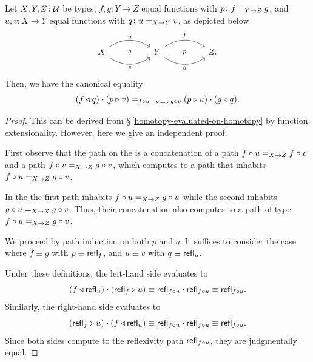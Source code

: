 \begin{prop}\label{prop:path-interchange}
    Let\/ $X,Y,Z\colon\univ$ be types, $f,g\colon Y\to Z$ equal functions with $p\colon f\eq{Y\to Z}g$, and\/ $u,v\colon X\to Y$ equal functions with $q\colon u\eq{X\to Y}v$, as depicted below
    \[
        \begin{tikzcd}[column sep=huge]
            X
                    \arrow[r,"u",bend left=35]
                    \arrow[r,"v"',bend right=35]
                    \arrow[r,"\scriptstyle q",phantom]
                &Y
                    \arrow[r,"f",bend left=35]
                    \arrow[r,"g"',bend right=35]
                    \arrow[r,"\scriptstyle p",phantom]
                &Z.
        \end{tikzcd}
    \]
    Then, we have the canonical equality
    \[
        (f\triangleleft q)\mathbin{\boldsymbol{\cdot}}(p\triangleright v)
        \mathrel{=_{f\circ u\mathrel{=_{X\to Z}}g\circ v}}
        (p\triangleright u)\mathbin{\boldsymbol{\cdot}}(g\triangleleft q).
    \]
\end{prop}

\begin{proof}
    This can be derived from \S\,\ref{homotopy-evaluated-on-homotopy} by function extensionality. However, here we give an independent proof.

    First observe that the path on the \lhs is a concatenation of a path $f\circ u\mathrel{=_{X\to Z}}f\circ v$ and a path $f\circ v\mathrel{=_{X\to Z}}g\circ v$, which computes to a path that inhabits $f\circ u\mathrel{=_{X\to Z}}g\circ v$.

    In the \rhs the first path inhabits $f\circ u\mathrel{=_{X\to Z}}g\circ u$ while the second inhabits $g\circ u\mathrel{=_{X\to Z}}g\circ v$. Thus, their concatenation also computes to a path of type $f\circ u\mathrel{=_{X\to Z}}g\circ v$.

    We proceed by path induction on both \/ $p$ and \/ $q$. It suffices to consider the case where \/ $f\equiv g$ with \/ $p\equiv\mathsf{refl}_f$, and \/ $u\equiv v$ with \/ $q\equiv\mathsf{refl}_u$.

    Under these definitions, the left-hand side evaluates to
    \[
        (f\triangleleft\mathsf{refl}_u)\mathbin{\boldsymbol{\cdot}}(\mathsf{refl}_f\triangleright u)
        \equiv\mathsf{refl}_{f\circ u}\mathbin{\boldsymbol{\cdot}}\mathsf{refl}_{f\circ u}
        \equiv\mathsf{refl}_{f\circ u}.
    \]
    Similarly, the right-hand side evaluates to
    \[
        (\mathsf{refl}_f\triangleright u)\mathbin{\boldsymbol{\cdot}}(f\triangleleft\mathsf{refl}_u)
        \equiv\mathsf{refl}_{f\circ u}\mathbin{\boldsymbol{\cdot}}\mathsf{refl}_{f\circ u}
        \equiv\mathsf{refl}_{f\circ u}.
    \]
    Since both sides compute to the reflexivity path \/ $\mathsf{refl}_{f\circ u}$, they are judgmentally equal.
\end{proof}

